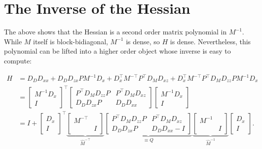 \documentclass{article}
\begin{document}
\section{The Inverse of the Hessian}

The above shows that the Hessian is a second order matrix polynomial in
$M^{-1}$. While $M$ itself is block-bidiagonal, $M^{-1}$ is dense, so $H$ is
dense. Nevertheless, this polynomial can be lifted into a higher order object
whose inverse is easy to compute:

\begin{align*}
    H & = D_DD_{xx}  + D_DD_{zx} PM^{-1} D_x + D_x^\top M^{-\top}P^\top D_M D_{xz}+D_x^\top M^{-\top}P^\top D_M D_{zz}P M^{-1}D_x \\
      & = \begin{bmatrix}
              M^{-1}D_x \\ I
          \end{bmatrix}
    ^\top
    \begin{bmatrix}
        P^\top D_M D_{zz} P & P^\top D_M D_{xz} \\
        D_D D_{zx} P        & D_D D_{xx}
    \end{bmatrix}
    \begin{bmatrix}
        M^{-1}D_x \\ I
    \end{bmatrix}
    \\
      & = I +  \begin{bmatrix}
                   D_x \\ I
               \end{bmatrix}
    ^\top
    \underbrace{\begin{bmatrix}
                        M^{-\top} & \\ & I
                    \end{bmatrix}
    }_{\hat{M}^{-\top}}
    \underbrace{
        \begin{bmatrix}
            P^\top D_M D_{zz} P & P^\top D_M D_{xz} \\
            D_D D_{zx} P        & D_D D_{xx}-I
        \end{bmatrix}
    }_{\equiv Q}
    \underbrace{\begin{bmatrix}
                        M^{-1} & \\ & I
                    \end{bmatrix}
    }_{\hat{M}^{-1}}
    \begin{bmatrix}
        D_x \\ I
    \end{bmatrix}
    .
\end{align*}
\end{document}

